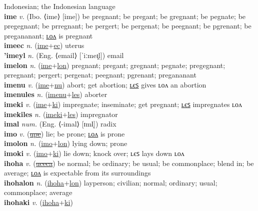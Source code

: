 Indonesian; the Indonesian language \label{'intonesiatilip} \\
\textbf{ime} \textit{v.} (Ibo. ⟨ime⟩ [ime])
be pregnant; be pregant; be gregnant; be pegnate; be pregegnant; be prregnant; be pergert; be pergenat; be peegnant; be pgrenant; be pregananant; \hyperref[imelon]{ʟᴏᴧ} is pregnant \label{ime} \\
\textbf{imeec} \textit{n.} (\hyperref[ime]{ime}+\hyperref[ec]{ec})
uterus \label{imeec} \\
\textbf{'imeyl} \textit{n.} (Eng. ⟨email⟩ [ˈiːmeɪ̯l])
email \label{'imeyl} \\
\textbf{imelon} \textit{n.} (\hyperref[ime]{ime}+\hyperref[lon]{lon})
pregnant; pregant; gregnant; pegnate; pregegnant; prregnant; pergert; pergenat; peegnant; pgrenant; pregananant \label{imelon} \\
\textbf{imenu} \textit{v.} (\hyperref[ime]{ime}+\hyperref[nu]{nu})
abort; get abortion; \hyperref[imenules]{ʟєꜱ} gives ʟᴏᴧ an abortion \label{imenu} \\
\textbf{imenules} \textit{n.} (\hyperref[imenu]{imenu}+\hyperref[les]{les})
aborter \label{imenules} \\
\textbf{imeki} \textit{v.} (\hyperref[ime]{ime}+\hyperref[ki]{ki})
impregnate; inseminate; get pregnant; \hyperref[imekiles]{ʟєꜱ} impregnates ʟᴏᴧ \label{imeki} \\
\textbf{imekiles} \textit{n.} (\hyperref[imeki]{imeki}+\hyperref[les]{les})
impregnator \label{imekiles} \\
\textbf{imal} \textit{num.} (Eng. ⟨-imal⟩ [ɪml̩])
radix \label{imal} \\
\textbf{imo} \textit{v.} (\hyperref[upe]{\sout{upe}})
lie; be prone; \hyperref[imolon]{ʟᴏᴧ} is prone \label{imo} \\
\textbf{imolon} \textit{n.} (\hyperref[imo]{imo}+\hyperref[lon]{lon})
lying down; prone \label{imolon} \\
\textbf{imoki} \textit{v.} (\hyperref[imo]{imo}+\hyperref[ki]{ki})
lie down; knock over; ʟєꜱ lays down ʟᴏᴧ \label{imoki} \\
\textbf{ihoha} \textit{v.} (\hyperref[uceca]{\sout{uceca}})
be normal; be ordinary; be usual; be commonplace; blend in; be average; \hyperref[ihohalon]{ʟᴏᴧ} is expectable from its surroundings \label{ihoha} \\
\textbf{ihohalon} \textit{n.} (\hyperref[ihoha]{ihoha}+\hyperref[lon]{lon})
layperson; civilian; normal; ordinary; usual; commonplace; average \label{ihohalon} \\
\textbf{ihohaki} \textit{v.} (\hyperref[ihoha]{ihoha}+\hyperref[ki]{ki})
